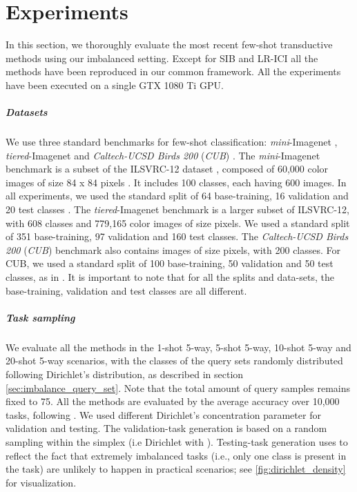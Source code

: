 \section{Experiments} \label{sec:experiments}

    In this section, we thoroughly evaluate the most recent few-shot transductive methods using our imbalanced setting. Except for SIB \cite{hu2020empirical} and LR-ICI \cite{wang2020instance} all the methods have been reproduced in our common framework. All the experiments have been executed on a single GTX 1080 Ti GPU. 

    \subparagraph{Datasets}

        We use three standard benchmarks for few-shot classification: \textit{mini}-Imagenet \cite{ILSVRC15}, \textit{tiered}-Imagenet \cite{ren18fewshotssl} and \textit{Caltech-UCSD Birds 200} (\textit{CUB}) \cite{wah2011caltech}. The \textit{mini}-Imagenet benchmark is a subset of the ILSVRC-12 dataset \cite{ILSVRC15}, composed of 60,000 color images of size 84 x 84 pixels \cite{Vinyals2016MatchingNF}. It includes 100 classes, each having 600 images. In all experiments, we used the standard split of 64 base-training, 16 validation and 20 test classes \cite{Ravi2017OptimizationAA,wang2019simpleshot}. The \textit{tiered}-Imagenet benchmark is a larger subset of ILSVRC-12, with 608 classes and 779,165 color images of size  pixels. We used a standard split of 351 base-training, 97 validation and 160 test classes. The \textit{Caltech-UCSD Birds 200} (\textit{CUB}) benchmark also contains images of size  pixels, with 200 classes. For CUB, we used a standard split of 100 base-training, 50 validation and 50 test classes, as in \cite{chen2018a}. It is important to note that for all the splits and data-sets, the base-training, validation and test classes are all different.


    \subparagraph{Task sampling}
    \label{par:task_sampling}

        We evaluate all the methods in the 1-shot 5-way, 5-shot 5-way, 10-shot 5-way and 20-shot 5-way scenarios, with the classes of the query sets randomly distributed following Dirichlet's distribution, as described in section \ref{sec:imbalance_query_set}. Note that the total amount of query samples  remains fixed to 75. All the methods are evaluated by the average accuracy over 10,000 tasks, following \cite{wang2019simpleshot}. We used different Dirichlet's concentration parameter  for validation and testing. The validation-task generation is based on a random sampling within the simplex (i.e Dirichlet with ). Testing-task generation uses  to reflect the fact that extremely imbalanced tasks (i.e., only one class is present in the task) are unlikely to happen in practical scenarios; see \autoref{fig:dirichlet_density} for visualization.

